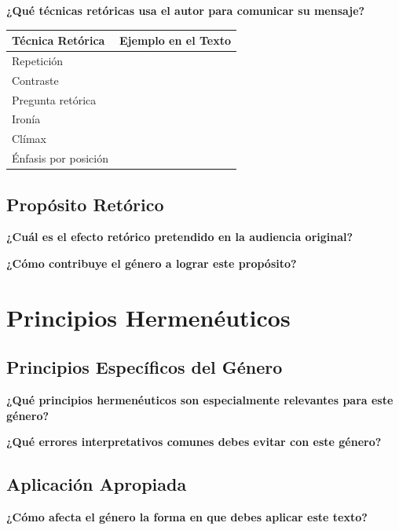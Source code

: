 \documentclass[11pt,a4paper]{article}
\begin{document}
\textbf{¿Qué técnicas retóricas usa el autor para comunicar su mensaje?}

\begin{tabularx}{\textwidth}{|X|X|}
\hline
\textbf{Técnica Retórica} & \textbf{Ejemplo en el Texto} \\
\hline
Repetición & \\[1cm]
\hline
Contraste & \\[1cm]
\hline
Pregunta retórica & \\[1cm]
\hline
Ironía & \\[1cm]
\hline
Clímax & \\[1cm]
\hline
Énfasis por posición & \\[1cm]
\hline
\end{tabularx}

\subsection{Propósito Retórico}

\textbf{¿Cuál es el efecto retórico pretendido en la audiencia original?}
\vspace{3cm}

\textbf{¿Cómo contribuye el género a lograr este propósito?}
\vspace{2cm}

\section{Principios Hermenéuticos}

\subsection{Principios Específicos del Género}

\textbf{¿Qué principios hermenéuticos son especialmente relevantes para este género?}
\vspace{3cm}

\textbf{¿Qué errores interpretativos comunes debes evitar con este género?}
\vspace{3cm}

\subsection{Aplicación Apropiada}

\textbf{¿Cómo afecta el género la forma en que debes aplicar este texto?}
\vspace{3cm}
\end{document}
